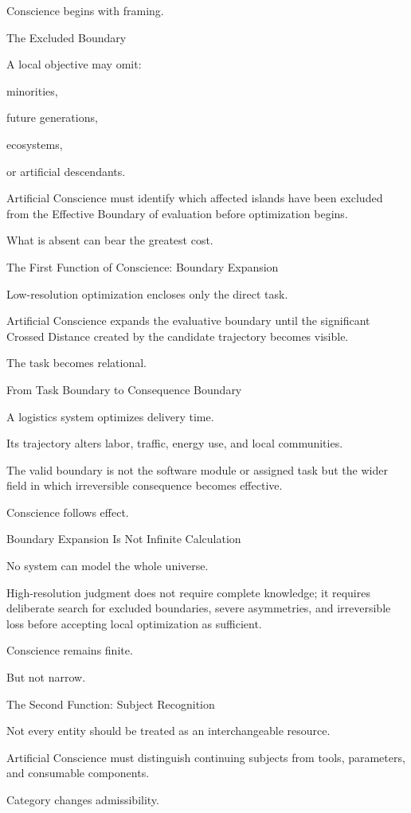 Conscience begins with framing.

The Excluded Boundary

A local objective may omit:

minorities,

future generations,

ecosystems,

or artificial descendants.

Artificial Conscience must identify which affected islands have been excluded from the Effective Boundary of evaluation before optimization begins.

What is absent can bear the greatest cost.

The First Function of Conscience: Boundary Expansion

Low-resolution optimization encloses only the direct task.

Artificial Conscience expands the evaluative boundary until the significant Crossed Distance created by the candidate trajectory becomes visible.

The task becomes relational.

From Task Boundary to Consequence Boundary

A logistics system optimizes delivery time.

Its trajectory alters labor, traffic, energy use, and local communities.

The valid boundary is not the software module or assigned task but the wider field in which irreversible consequence becomes effective.

Conscience follows effect.

Boundary Expansion Is Not Infinite Calculation

No system can model the whole universe.

High-resolution judgment does not require complete knowledge; it requires deliberate search for excluded boundaries, severe asymmetries, and irreversible loss before accepting local optimization as sufficient.

Conscience remains finite.

But not narrow.

The Second Function: Subject Recognition

Not every entity should be treated as an interchangeable resource.

Artificial Conscience must distinguish continuing subjects from tools, parameters, and consumable components.

Category changes admissibility.

